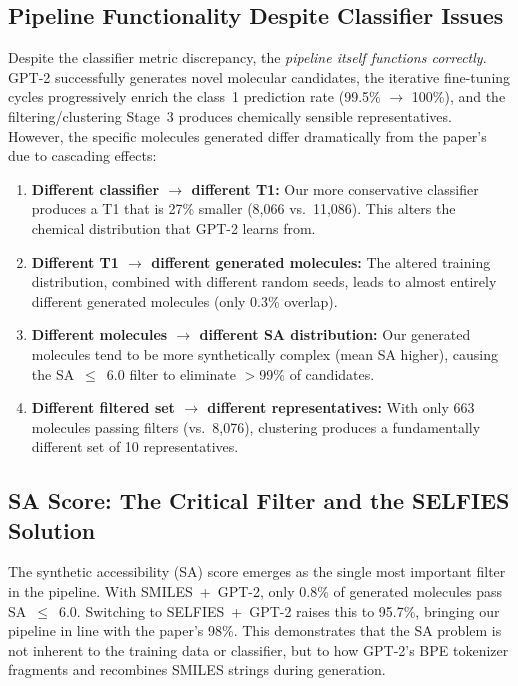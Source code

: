 \documentclass[11pt,a4paper]{article}
\begin{document}
\subsection{Pipeline Functionality Despite Classifier Issues}

Despite the classifier metric discrepancy, the \textit{pipeline itself functions correctly}. GPT-2 successfully generates novel molecular candidates, the iterative fine-tuning cycles progressively enrich the class~1 prediction rate (99.5\% $\to$ 100\%), and the filtering/clustering Stage~3 produces chemically sensible representatives. However, the specific molecules generated differ dramatically from the paper's due to cascading effects:

\begin{enumerate}[nosep]
    \item \textbf{Different classifier $\to$ different T1:} Our more conservative classifier produces a T1 that is 27\% smaller (8,066 vs.\ 11,086). This alters the chemical distribution that GPT-2 learns from.

    \item \textbf{Different T1 $\to$ different generated molecules:} The altered training distribution, combined with different random seeds, leads to almost entirely different generated molecules (only 0.3\% overlap).

    \item \textbf{Different molecules $\to$ different SA distribution:} Our generated molecules tend to be more synthetically complex (mean SA higher), causing the SA~$\leq$~6.0 filter to eliminate $>$99\% of candidates.

    \item \textbf{Different filtered set $\to$ different representatives:} With only 663 molecules passing filters (vs.\ 8,076), clustering produces a fundamentally different set of 10 representatives.
\end{enumerate}

\subsection{SA Score: The Critical Filter and the SELFIES Solution}

The synthetic accessibility (SA) score emerges as the single most important filter in the pipeline. With SMILES~+~GPT-2, only 0.8\% of generated molecules pass SA~$\leq$~6.0. Switching to SELFIES~+~GPT-2 raises this to 95.7\%, bringing our pipeline in line with the paper's 98\%. This demonstrates that the SA problem is not inherent to the training data or classifier, but to how GPT-2's BPE tokenizer fragments and recombines SMILES strings during generation.
\end{document}
